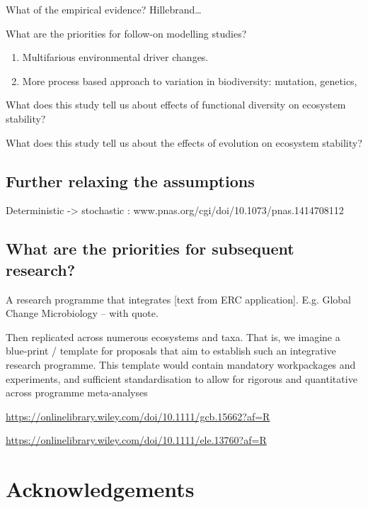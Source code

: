 \documentclass{article}
\begin{document}
What of the empirical evidence? Hillebrand\ldots{}

What are the priorities for follow-on modelling studies?

\begin{enumerate}
\def\labelenumi{\arabic{enumi})}
\tightlist
\item
  Multifarious environmental driver changes.
\item
  More process based approach to variation in biodiversity: mutation,
  genetics,
\end{enumerate}

What does this study tell us about effects of functional diversity on
ecosystem stability?

What does this study tell us about the effects of evolution on ecosystem
stability?

\hypertarget{further-relaxing-the-assumptions}{%
\subsection{Further relaxing the
assumptions}\label{further-relaxing-the-assumptions}}

Deterministic -\textgreater{} stochastic :
www.pnas.org/cgi/doi/10.1073/pnas.1414708112

\hypertarget{what-are-the-priorities-for-subsequent-research}{%
\subsection{What are the priorities for subsequent
research?}\label{what-are-the-priorities-for-subsequent-research}}

A research programme that integrates {[}text from ERC application{]}.
E.g. Global Change Microbiology -- with quote.

Then replicated across numerous ecosystems and taxa. That is, we imagine
a blue-print / template for proposals that aim to establish such an
integrative research programme. This template would contain mandatory
workpackages and experiments, and sufficient standardisation to allow
for rigorous and quantitative across programme meta-analyses

\url{https://onlinelibrary.wiley.com/doi/10.1111/gcb.15662?af=R}

\url{https://onlinelibrary.wiley.com/doi/10.1111/ele.13760?af=R}

\hypertarget{acknowledgements}{%
\section{Acknowledgements}\label{acknowledgements}}
\end{document}
